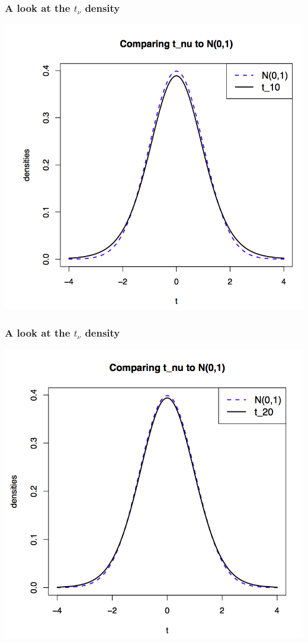 \documentclass[handout]{beamer}\usepackage[]{graphicx}\usepackage[]{color}
\numberwithin{equation}{section}
\begin{document}
\begin{frame}
\frametitle{A look at the $t_\nu$ density}
 \includegraphics{../../fig/tapprox3.png}
\end{frame}
\begin{frame}
\frametitle{A look at the $t_\nu$ density}
 \includegraphics{../../fig/tapprox4.png}
\end{frame}
\end{document}
